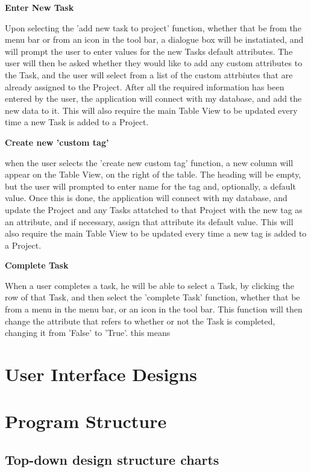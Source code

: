 \textbf{Enter New Task}

Upon selecting the 'add new task to project' function, whether that be from the menu bar or from an icon in the tool bar, a dialogue box will be instatiated, and will prompt the user to enter values for the new Tasks default attributes. The user will then be asked whether they would like to add any custom attributes to the Task, and the user will select from a list of the custom attrbiutes that are already assigned to the Project. After all the required information has been entered by the user, the application will connect with my database, and add the new data to it. This will also require the main Table View to be updated every time a new Task is added to a Project.

\textbf{Create new 'custom tag'}

when the user selects the 'create new custom tag' function, a new column will appear on the Table View, on the right of the table. The heading will be empty, but the user will prompted to enter name for the tag and, optionally, a default value. Once this is done, the application will connect with my database, and update the Project and any Tasks attatched to that Project with the new tag as an attribute, and if necessary, assign that attribute its default value. This will also require the main Table View to be updated every time a new tag is added to a Project.

\textbf{Complete Task}

When a user completes a task, he will be able to select a Task, by clicking the row of that Task, and then select the 'complete Task' function, whether that be from a menu in the menu bar, or an icon in the tool bar. This function will then change the attribute that refers to whether or not the Task is completed, changing it from 'False' to 'True'. this means 

\section{User Interface Designs}

\section{Program Structure}

\subsection{Top-down design structure charts}

